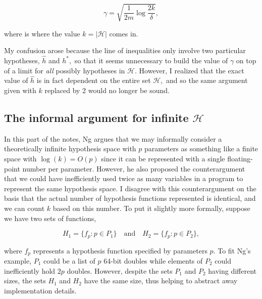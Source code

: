 \documentclass[]{article}
\begin{document}
\[\gamma = \sqrt{\frac{1}{2m}\log\frac{2k}{\delta}},\]

where is where the value \(k = |\mathcal H|\) comes in.

My confusion arose because the line of inequalities only involve two
particular hypotheses, \(\hat h\) and \(h^*,\) so that it seems
unnecessary to build the value of \(\gamma\) on top of a limit for
\emph{all} possibly hypotheses in \(\mathcal H.\) However, I realized
that the exact value of \(\hat h\) is in fact dependent on the entire
set \(\mathcal H,\) and so the same argument given with \(k\) replaced
by 2 would no longer be sound.

\subsection{\texorpdfstring{The informal argument for infinite
\(\mathcal H\)}{The informal argument for infinite \textbackslash{}mathcal H}}\label{the-informal-argument-for-infinite-mathcal-h}

In this part of the notes, Ng argues that we may informally consider a
theoretically infinite hypothesis space with \(p\) parameters as
something like a finite space with \(\log(k) = O(p)\) since it can be
represented with a single floating-point number per parameter. However,
he also proposed the counterargument that we could have inefficiently
used twice as many variables in a program to represent the same
hypothesis space. I disagree with this counterargument on the basis that
the actual number of hypothesis functions represented is identical, and
we can count \(k\) based on this number. To put it slightly more
formally, suppose we have two sets of functions,

\[H_1 = \{f_p: p\in P_1\} \quad\text{and}\quad H_2 = \{f_p: p\in P_2\},\]

where \(f_p\) represents a hypothesis function specified by parameters
\(p.\) To fit Ng's example, \(P_1\) could be a list of \(p\) 64-bit
doubles while elements of \(P_2\) could inefficiently hold \(2p\)
doubles. However, despite the sets \(P_1\) and \(P_2\) having different
sizes, the sets \(H_1\) and \(H_2\) have the same size, thus helping to
abstract away implementation details.

\hypertarget{refs}{}
\end{document}
